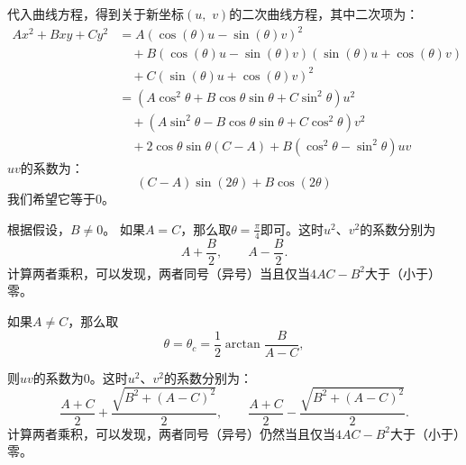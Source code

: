 \documentclass[12pt,UTF8]{ctexbook}
\theoremstyle{definition}
\theoremstyle{plain}
\begin{document}
代入曲线方程，得到关于新坐标$(u,\,\,v)$的二次曲线方程，其中二次项为：
\begin{align*}
    Ax^2 + Bxy + Cy^2 &= A(\cos{(\theta)}u - \sin{(\theta)}v)^2 \\
    &\quad + B(\cos{(\theta)}u - \sin{(\theta)}v)(\sin{(\theta)}u + \cos{(\theta)}v) \\
    &\quad + C(\sin{(\theta)}u + \cos{(\theta)}v)^2 \\
    &= (A\cos^2{\theta} + B\cos{\theta}\sin{\theta} + C\sin^2{\theta})u^2 \\
    &\quad + (A\sin^2{\theta} - B\cos{\theta}\sin{\theta} + C\cos^2{\theta})v^2 \\
    &\quad + 2\cos{\theta}\sin{\theta}(C - A) + B(\cos^2{\theta} - \sin^2{\theta})uv
\end{align*}
$uv$的系数为：
$$ (C - A)\sin{(2\theta)} + B\cos{(2\theta)} $$
我们希望它等于$0$。

根据假设，$B\neq 0$。
如果$A = C$，那么取$\theta = \frac{\pi}{4}$即可。这时$u^2$、$v^2$的系数分别为
$$ A + \frac{B}{2}, \qquad A - \frac{B}{2}. $$
计算两者乘积，可以发现，两者同号（异号）当且仅当$4AC - B^2$大于（小于）零。

如果$A\neq C$，那么取
$$\theta = \theta_c = \frac{1}{2} \arctan{\frac{B}{A - C}},$$



则$uv$的系数为$0$。这时$u^2$、$v^2$的系数分别为：
$$ \frac{A+C}{2} + \frac{\sqrt{B^2 + (A - C)^2}}{2}, \qquad \frac{A+C}{2} - \frac{\sqrt{B^2 + (A - C)^2}}{2}. $$
计算两者乘积，可以发现，两者同号（异号）仍然当且仅当$4AC - B^2$大于（小于）零。
\end{document}
